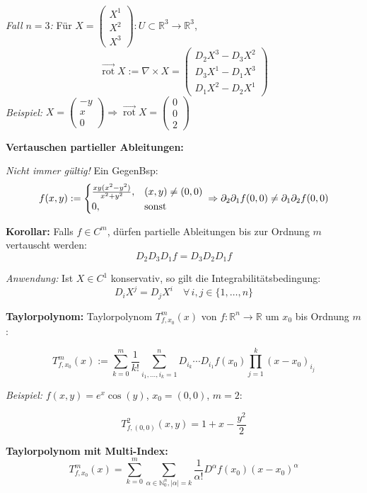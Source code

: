\textit{Fall \(n=3\):} Für \( X = \begin{pmatrix} X^1 \\ X^2 \\ X^3 \end{pmatrix} : U \subset \mathbb{R}^3 \to \mathbb{R}^3 \),
\[
\vec{\operatorname{rot}} X := \nabla \times X = \begin{pmatrix}
D_2 X^3 - D_3 X^2 \\
D_3 X^1 - D_1 X^3 \\
D_1 X^2 - D_2 X^1
\end{pmatrix}
\]
\textit{Beispiel:} \( X = \begin{pmatrix} -y \\ x \\ 0 \end{pmatrix} \Rightarrow \vec{\operatorname{rot}} X = \begin{pmatrix} 0 \\ 0 \\ 2 \end{pmatrix} \)

\textbf{Vertauschen partieller Ableitungen:}

\textit{Nicht immer gültig!} Ein GegenBsp:
\[
f(x,y) := \begin{cases}
\frac{xy(x^2 - y^2)}{x^2 + y^2}, & (x,y)\neq(0,0) \\
0, & \text{sonst}
\end{cases} \\
\Rightarrow \partial_2 \partial_1 f(0,0) \ne \partial_1 \partial_2 f(0,0)
\]

\textbf{Korollar:} Falls \(f \in C^m\), dürfen partielle Ableitungen bis zur Ordnung \(m\) vertauscht werden:
\[
D_2 D_3 D_1 f = D_3 D_2 D_1 f
\]

\textit{Anwendung:} Ist \(X \in C^1\) konservativ, so gilt die Integrabilitätsbedingung:
\[
D_i X^j = D_j X^i \quad \forall\, i,j \in \{1,\dots,n\}
\]

\textbf{Taylorpolynom:} Taylorpolynom $T_{f,x_0}^m(x)$ von $f: \mathbb{R}^n \to \mathbb{R}$ um $x_0$ bis Ordnung $m$:

\begingroup
\footnotesize
\[
T_{f,x_0}^m(x) := \sum_{k=0}^{m} \frac{1}{k!} \sum_{i_1,\dots,i_k=1}^{n} D_{i_k} \!\cdots\! D_{i_1}f(x_0) \prod_{j=1}^{k} (x\!-\!x_0)_{i_j}
\]
\endgroup

\textit{Beispiel:} $f(x,y) = e^x\cos(y)$, $x_0 = (0,0)$, $m = 2$:

\[
T_{f,(0,0)}^2(x,y) = 1 + x - \frac{y^2}{2}
\]

\textbf{Taylorpolynom mit Multi-Index:}
\[
T^m_{f,x_0}(x) = \sum_{k=0}^m \sum_{\alpha \in \mathbb{N}_0^n, |\alpha| = k} \frac{1}{\alpha!} D^\alpha f(x_0) (x - x_0)^\alpha
\]

